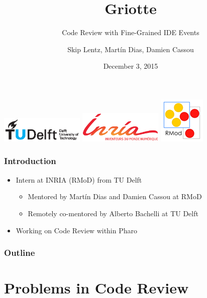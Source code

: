\documentclass[aspectratio=169]{beamer}
\title{Griotte}
\subtitle{Code Review with Fine-Grained IDE Events}
\author{Skip Lentz, Mart\'{i}n Dias, Damien Cassou}
\institute{TU Delft, INRIA Lille - Nord Europe}
\date{December 3, 2015}
\begin{document}
\begin{frame}

\titlepage
\centering
\includegraphics[width=40mm]{img/tu_delft_logo.eps}
\includegraphics[width=40mm]{img/inria_logo.eps}
\includegraphics{img/rmod_logo.png}

\end{frame}

\begin{frame}[fragile]

\frametitle{Introduction}

\begin{itemize}
\item Intern at INRIA (RMoD) from TU Delft
\begin{itemize}
\item Mentored by Mart\'{i}n Dias and Damien Cassou at RMoD
\item Remotely co-mentored by Alberto Bachelli at TU Delft
\end{itemize}

\item Working on Code Review within Pharo
\end{itemize}
\end{frame}

\begin{frame}[fragile]

\frametitle{Outline}

\tableofcontents%

\end{frame}

\section{Problems in Code Review}
\end{document}
